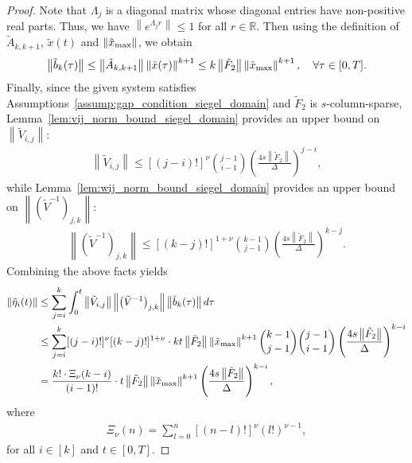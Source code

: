 \documentclass[superscriptaddress,onecolumn,nofootinbib,longbibliography,a4paper,accepted=2026-09-29]{quantumarticle}
\theoremstyle{plain}
\theoremstyle{definition}
\numberwithin{thm}{section}
\numberwithin{assumption}{section}
\numberwithin{lemma}{section}
\numberwithin{prop}{section}
\numberwithin{cor}{section}
\numberwithin{definition}{section}
\numberwithin{rmk}{section}
\numberwithin{equation}{section}
\newcommand{\norm}[1]     {\left\| #1 \right\|}
\newcommand{\R}{\mathbb{R}}
\newcommand{\lrb}[1]{\left ( #1 \right )}
\begin{document}
\begin{proof}
    Note that $\Lambda_j$ is a diagonal matrix whose diagonal entries have non-positive real parts. Thus, we have $\norm{e^{\Lambda_j r}} \le 1$ for all $r \in \R$. Then using the definition of $\tilde{A}_{k, k+1}$,  $\tilde{x}(t)$ and $\norm{\tilde{x}_{\rm max}}$, we obtain
    \begin{align}
        \norm{\tilde{b}_k(\tau)} \le \norm{\tilde{A}_{k, k+1}} \norm{\tilde{x}(\tau)}^{k+1}
        \le k \norm{\tilde{F}_2} \norm{\tilde{x}_{\rm max}}^{k+1}, ~~~\forall \tau \in [0, T]. 
    \end{align}
    Finally, since the given system satisfies Assumptions~\ref{assump:gap_condition_siegel_domain} and $\tilde{F}_2$ is $s$-column-sparse, Lemma~\ref{lem:vij_norm_bound_siegel_domain} provides an upper bound on $\norm{\tilde{V}_{i,j}}$:
    \begin{align}
       \norm{\tilde{V}_{i,j}} \le [(j-i)!]^\nu \binom{j-1}{i-1} \lrb{\frac{4s\norm{\tilde{F}_2}}{\Delta}}^{j-i},
    \end{align}
    while Lemma~\ref{lem:wij_norm_bound_siegel_domain} provides an upper bound on $\norm{\lrb{\tilde{V}^{-1}}_{j,k}}$:
    \begin{align}
        \norm{\lrb{\tilde{V}^{-1}}_{j,k}} \le [(k-j)!]^{1+\nu}\binom{k-1}{j-1}\lrb{\frac{4s\norm{\tilde{F}_2}}{\Delta}}^{k-j}.
    \end{align}
    Combining the above facts yields
    \begin{align}
    \norm{\tilde{\eta}_i(t)} &\le \sum_{j=i}^k \int_0^t \norm{\tilde{V}_{i,j}} \norm{\lrb{\tilde{V}^{-1}}_{j,k}} \norm{\tilde{b}_k(\tau)} 
    d\tau \\
    & \le \sum_{j=i}^k [(j-i)!]^\nu [(k-j)!]^{1+\nu} \cdot
    k t \norm{\tilde{F}_2} \norm{\tilde{x}_{\rm max}}^{k+1}
        \binom{k-1}{j-1}\binom{j-1}{i-1}\lrb{\frac{4s\norm{\tilde{F}_2}}{\Delta}}^{k-i} \\
    & =  \frac{k! \cdot \Xi_{\nu}(k-i)}{(i-1)!} 
        \cdot t \norm{\tilde{F}_2} \norm{\tilde{x}_{\rm max}}^{k+1} \lrb{\frac{4 s\norm{\tilde{F}_2}}{\Delta}}^{k-i},
    \label{eq:tilde_eta_i_bound_siegel_domain}
    \end{align}
    where 
    \begin{align}
    \Xi_{\nu}(n)=\sum_{l=0}^n [(n-l)!]^{\nu}(l!)^{\nu-1},       
    \end{align}
    for all $i \in [k]$ and $t \in [0, T]$.
    

\end{proof}
\end{document}

